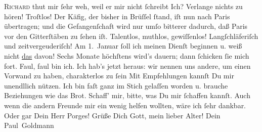 \begin{ledgroupsized}[t]{13cm}
           \pstart
           \textsc{Richard} thut mir ſehr weh, weil er mir nicht ſchreibt{\dotsfive}\pend
           \pstart
           Ich? Verlange nichts zu hören! Troſtlos! Der Käfig, der bisher in Brüſſel ſtand, iſt nun nach Paris übertragen; und die Gefangenſchaft wird nur {\pb}umſo bitterer dadurch, daß Paris vor den Gitterſtäben zu ſehen iſt. Talentlos, muthlos,
               gewiſſenlos! Langſchläferiſch und zeitvergeuderiſch! Am 1. Januar ſoll ich meinen Dienſt beginnen u. weiß nicht \uline{das} davon! Sechs Monate höchſtens wird’s dauern; dann
               ſchicken ſie mich fort. Faul, faul bin ich. Ich hab’s jetzt heraus: wir nennen uns
               andere, um einen Vorwand zu haben, charakterlos zu ſein{\dotsfour}\pend
           \pstart
           Mit Empfehlungen kannſt Du mir unendllich nützen. Ich bin faſt ganz im Stich gelaſſen
               worden u. brauche Beziehungen wie das Brot. Schaff’ mir, bitte, was Du mir ſchaffen
               kannſt. Auch wenn die andern Freunde mir ein wenig helfen wollten, wäre ich ſehr
               dankbar. Oder gar Dein Herr Porges! Grüße Dich Gott, mein lieber Alter!\pend
           \pstart Dein \spacefill\mbox{Paul Goldmann}\pend{}\pstart
           \noindent{}\label{T_L02676-1v}\label{T_L02676-1h}\pend
           
         
         \endnumbering{}\end{ledgroupsized}  \newcommand{\dateiname}{L02676}\newcommand{\titel}{Paul Goldmann an Arthur Schnitzler, 18. 12. 1891}\newcommand{\editorInnen}{Martin Anton Müller und Laura Untner}
      